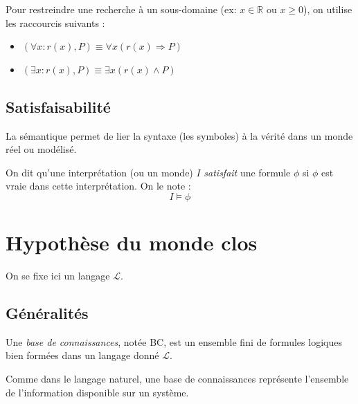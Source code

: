 \begin{definition}
    Pour restreindre une recherche à un sous-domaine (ex: $x \in \mathbb{R}$ ou $x \geqslant 0$), on utilise les raccourcis 
    suivants :
    \begin{itemize}
        \item $(\forall x : r(x), P) \equiv \forall x (r(x) \Rightarrow P)$ 
        \item $(\exists x : r(x), P) \equiv \exists x (r(x) \land P)$ 
    \end{itemize}
\end{definition}

\subsection{Satisfaisabilité}

La sémantique permet de lier la syntaxe (les symboles) à la vérité dans un monde réel ou modélisé.

\begin{definition}
    On dit qu'une interprétation (ou un monde) $I$ \emph{satisfait} une formule $\phi$ si $\phi$ est vraie dans cette interprétation. 
    On le note :
        \[ I \models \phi \]
\end{definition}


\section{Hypothèse du monde clos}

On se fixe ici un langage $ \mathcal{L}$. 

\subsection{Généralités}

\begin{definition}
    Une \emph{base de connaissances}, notée BC, est un ensemble fini de formules logiques 
    bien formées dans un langage donné $ \mathcal{L}$. 
\end{definition}

Comme dans le langage naturel, une base de connaissances représente l'ensemble de l'information 
disponible sur un système. 

